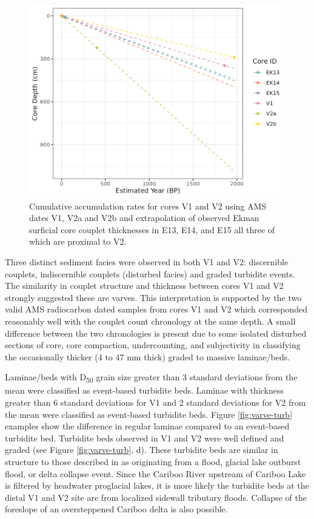 \documentclass[Royal,times,doublespace,sageh]{sagej}
\begin{document}
\begin{figure}

{\centering \includegraphics[width=1\linewidth]{../figs/sed_rates_V1_V2_ekmans} 

}

\caption{Cumulative accumulation rates for cores V1 and V2 using AMS dates V1, V2a and V2b and extrapolation of observed Ekman surficial core couplet thicknesses in E13, E14, and E15 all three of which are proximal to V2.\label{fig:amsRates}}\label{fig:amsRates}
\end{figure}

Three distinct sediment facies were observed in both V1 and V2:
discernible couplets, indiscernible couplets (disturbed facies) and
graded turbidite events. The similarity in couplet structure and
thickness between cores V1 and V2 strongly suggested these are varves.
This interpretation is supported by the two valid AMS radiocarbon dated
samples from cores V1 and V2 which corresponded reasonably well with the
couplet count chronology at the same depth. A small difference between
the two chronologies is present due to some isolated disturbed sections
of core, core compaction, undercounting, and subjectivity in classifying
the occasionally thicker (4 to 47 mm thick) graded to massive
laminae/beds.

Laminae/beds with D\textsubscript{50} grain size greater than 3 standard
deviations from the mean were classified as event-based turbidite beds.
Laminae with thickness greater than 6 standard deviations for V1 and 2
standard deviations for V2 from the mean were classified as event-based
turbidite beds. Figure \ref{fig:varve-turb} examples show the difference
in regular laminae compared to an event-based turbidite bed. Turbidite
beds observed in V1 and V2 were well defined and graded (see Figure
\ref{fig:varve-turb}, d). These turbidite beds are similar in structure
to those described in \citet{sabatier2022} as originating from a flood,
glacial lake outburst flood, or delta collapse event. Since the Cariboo
River upstream of Cariboo Lake is filtered by headwater proglacial
lakes, it is more likely the turbidite beds at the distal V1 and V2 site
are from localized sidewall tributary floods. Collapse of the foreslope
of an oversteppened Cariboo delta is also possible.
\end{document}
